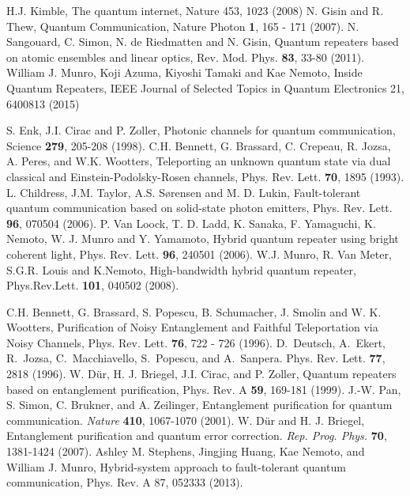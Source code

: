 \documentclass[twocolumn, aps, rmp, amsmath, amssymb, nofootinbib, superscriptaddress, longbibliography, floatfix, table-of-contents, eqsecnum]{revtex4-1}
\begin{document}
\begin{thebibliography}{99}
%
 H.J. Kimble, The quantum internet, Nature 453, 1023 (2008)
%
 N. Gisin and R. Thew, Quantum Communication, Nature Photon {\bf 1}, 165 - 171 (2007).
%
 N. Sangouard, C. Simon,  N. de Riedmatten and N. Gisin, Quantum repeaters based on atomic ensembles and linear optics, Rev. Mod. Phys. {\bf 83}, 33-80 (2011).
%
 William J. Munro, Koji Azuma, Kiyoshi Tamaki and Kae Nemoto, Inside Quantum Repeaters, IEEE Journal of Selected Topics in Quantum Electronics 21, 6400813 (2015)
%



 S. Enk, J.I. Cirac and P. Zoller, Photonic channels for quantum communication, Science {\bf 279}, 205-208 (1998).
%
  C.H. Bennett, G. Brassard, C. Crepeau, R. Jozsa, A. Peres, and W.K. Wootters,  Teleporting an unknown quantum state via dual classical and Einstein-Podolsky-Rosen channels, Phys. Rev. Lett. {\bf 70}, 1895 (1993). 
%
 L. Childress, J.M.  Taylor, A.S. S{\o}rensen and M. D.  Lukin, Fault-tolerant quantum communication based on solid-state photon emitters, Phys. Rev. Lett. {\bf 96}, 070504 (2006).
%
 P. Van Loock, T. D. Ladd, K. Sanaka, F. Yamaguchi, K. Nemoto, W. J. Munro and Y.  Yamamoto, Hybrid quantum repeater using bright coherent light, Phys. Rev. Lett. {\bf 96}, 240501 (2006).
%
 W.J. Munro, R. Van Meter, S.G.R. Louis and K.Nemoto, High-bandwidth hybrid quantum repeater, Phys.Rev.Lett. {\bf 101}, 040502 (2008).
%

 C.H. Bennett, G. Brassard, S. Popescu, B. Schumacher, J. Smolin and W. K.  Wootters, Purification of Noisy Entanglement and Faithful Teleportation via Noisy Channels, Phys. Rev. Lett. {\bf 76}, 722 - 726 (1996).
%
 D.~Deutsch, A.~Ekert, R.~Jozsa, C.~Macchiavello, S.~Popescu, and A.~Sanpera. Phys. Rev. Lett. {\bf 77}, 2818 (1996).
%
 W. D\"ur, H. J. Briegel, J.I. Cirac,  and P. Zoller, Quantum repeaters based on entanglement purification, Phys. Rev. A {\bf 59}, 169-181 (1999).
%
 {J.-W. Pan, S. Simon, C. Brukner, and A. Zeilinger}, Entanglement purification for quantum communication. \textit{Nature} {\bf 410}, 1067-1070 (2001).
%
 {W. D\"ur and H. J. Briegel,} Entanglement purification and quantum error correction. \textit{Rep. Prog. Phys.} {\bf 70}, 1381-1424 (2007).
%
 Ashley M. Stephens, Jingjing Huang, Kae Nemoto, and William J. Munro, Hybrid-system approach to fault-tolerant quantum communication, Phys. Rev. A 87, 052333 (2013).






\end{thebibliography}
\end{document}
